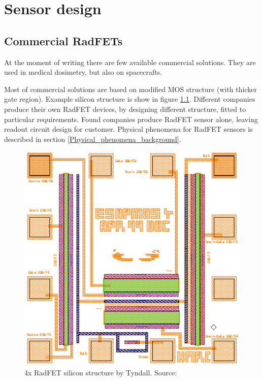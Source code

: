 \chapter{Sensor design}

\section{Commercial RadFETs}
At the moment of writing there are few available commercial solutions. They are used in medical dosimetry, but also on spacecrafts. 

Most of commercial solutions are based on modified MOS structure (with thicker gate region). Example silicon structure is show in figure \ref{Tyndall_radfet_silicon}. Different companies produce their own RadFET devices, by designing different structure, fitted to particular requirements. Found companies produce RadFET sensor alone, leaving readout circuit design for customer. Physical phenomena for RadFET sensors is described in section \ref{Physical_phenomena_background}.

\begin{figure}[H]
    \centering
    \includegraphics[width=0.5\paperwidth]{img/radfet-silicon.eps}
    \caption{4x RadFET silicon structure by Tyndall. Source: \cite{Tyndall_Radfet}}
    \label{Tyndall_radfet_silicon}
\end{figure}


